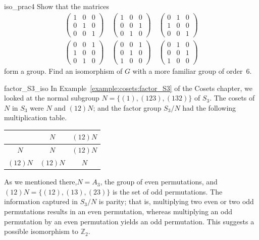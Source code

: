 \begin{exercise}{iso_prac4}
Show that the matrices
\begin{gather*}
\begin{pmatrix}
1 & 0 & 0 \\
0 & 1 & 0 \\
0 & 0 & 1
\end{pmatrix}
\quad
\begin{pmatrix}
1 & 0 & 0 \\
0 & 0 & 1 \\
0 & 1 & 0
\end{pmatrix}
\quad
\begin{pmatrix}
0 & 1 & 0 \\
1 & 0 & 0 \\
0 & 0 & 1
\end{pmatrix} \\
\begin{pmatrix}
0 & 0 & 1 \\
1 & 0 & 0 \\
0 & 1 & 0
\end{pmatrix}
\quad
\begin{pmatrix}
0 & 0 & 1 \\
0 & 1 & 0 \\
1 & 0 & 0
\end{pmatrix}
\quad
\begin{pmatrix}
0 & 1 & 0 \\
0 & 0 & 1 \\
1 & 0 & 0
\end{pmatrix}
\end{gather*}
form a group. Find an isomorphism of $G$ with a more familiar group of
order~6.
\end{exercise} 

\begin{example}{factor_S3_iso}
In Example~\ref{example:cosets:factor_S3} of the Cosets chapter, we looked at  the normal subgroup  $N = \{ (1), (123), (132)  \}$ of $S_3$.
The cosets of $N$ in $S_3$ were $N$ and $(12) N$; and the factor group $S_3
/ N$ had the following multiplication table.
\begin{center}
\begin{tabular}{c|cc}
         & $N$      & $(12) N$ \\
\hline
$N$      & $N$      & $(12) N$ \\
$(12) N$ & $(12) N$ & $N$
\end{tabular}
\end{center}

As we mentioned there,$N = A_3$, the group of even
permutations, and $(12) N = \{ (12), (13), (23) \}$ is the set of odd
permutations. The information captured in $S_3/N$ is parity; that is,
multiplying two even or two odd permutations results in an even
permutation, whereas multiplying an odd permutation by an even
permutation yields an odd permutation. This suggests a possible isomorphism to ${\mathbb Z}_2$.
\end{example}

